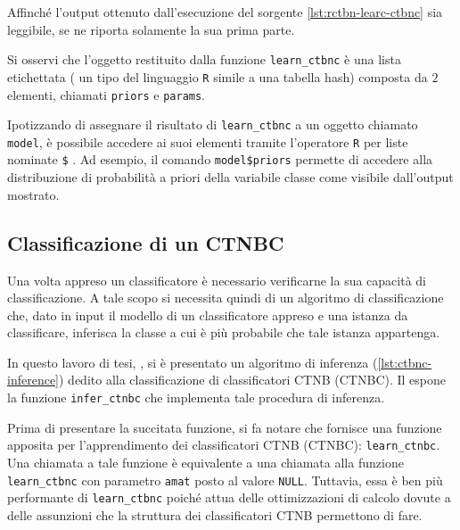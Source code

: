 \vspace*{8pt}

Affinché l'output ottenuto dall'esecuzione del sorgente \ref{lst:rctbn-learc-ctbnc} sia leggibile, se ne riporta solamente la sua prima parte.

\vspace*{8pt}\vspace*{8pt}

Si osservi che l'oggetto restituito dalla funzione \lstinline[language=rstats]{learn_ctbnc} è una lista etichettata (\ie{} un tipo del linguaggio \lstinline$R$ simile a una tabella hash) composta da $2$ elementi, chiamati \lstinline$priors$ e \lstinline$params$.

Ipotizzando di assegnare il risultato di \lstinline[language=rstats]{learn_ctbnc} a un oggetto chiamato \lstinline$model$, è possibile accedere ai suoi elementi tramite l'operatore \lstinline$R$ per liste nominate \lstinline[]|$|%
. Ad esempio, il comando \lstinline[]|model$priors| permette di accedere alla distribuzione di probabilità a priori della variabile classe come visibile dall'output mostrato.

\subsection{Classificazione di un CTNBC}
Una volta appreso un classificatore è necessario verificarne la sua capacità di classificazione. A tale scopo si necessita quindi di un algoritmo di classificazione che, dato in input il modello di un classificatore appreso e una istanza da classificare, inferisca la classe a cui è più probabile che tale istanza appartenga.

In questo lavoro di tesi, , si è presentato un algoritmo di inferenza (\autoref{lst:ctbnc-inference}) dedito alla classificazione di classificatori \acl{CTNB} (\acs{CTNBC}). Il \pacchettor{} espone la funzione \lstinline[language=rstats]{infer_ctnbc} che implementa tale procedura di inferenza.

Prima di presentare la succitata funzione, si fa notare che \rctbn{} fornisce una funzione apposita per l'apprendimento dei classificatori \acs{CTNB} (\acs{CTNBC}): \lstinline[language=rstats]{learn_ctnbc}. Una chiamata a tale funzione è equivalente a una chiamata alla funzione \lstinline[language=rstats]{learn_ctbnc} con parametro \lstinline$amat$ posto al valore \lstinline$NULL$. Tuttavia, essa è ben più performante di \lstinline[language=rstats]{learn_ctbnc} poiché attua delle ottimizzazioni di calcolo dovute a delle assunzioni che la struttura dei classificatori \acs{CTNB} permettono di fare.

